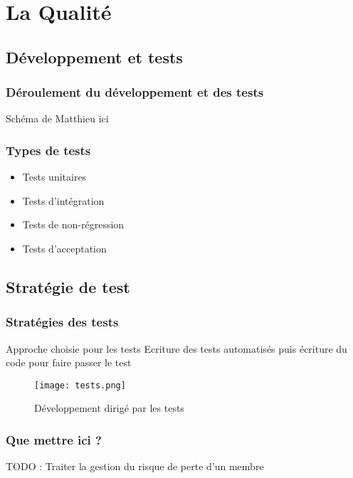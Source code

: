 \section{La Qualité}


\subsection{Développement et tests}

\begin{frame}
  \frametitle{\color{white} Déroulement du développement et des tests}
  Schéma de Matthieu ici

\end{frame}

\begin{frame}
  \frametitle{\color{white} Types de tests}
  \begin{itemize}
  \item Tests unitaires
  \item Tests d'intégration
  \item Tests de non-régression
  \item Tests d'acceptation
  \end{itemize}
  
  
\end{frame}



\subsection{Stratégie de test}
\begin{frame}
  \frametitle{\color{white} Stratégies des tests}
  \begin{block}{Approche choisie pour les tests}
   Ecriture des tests automatisés puis écriture du code pour faire passer le test
  \end{block}
  \begin{figure}[p]
    \centering
    \texttt{[image: tests.png]}
    \caption{Développement dirigé par les tests}
  \end{figure}
\end{frame}

\begin{frame}
  \frametitle{\color{white} Que mettre ici ?}
  TODO : Traiter la gestion du risque de perte d'un membre

\end{frame}


